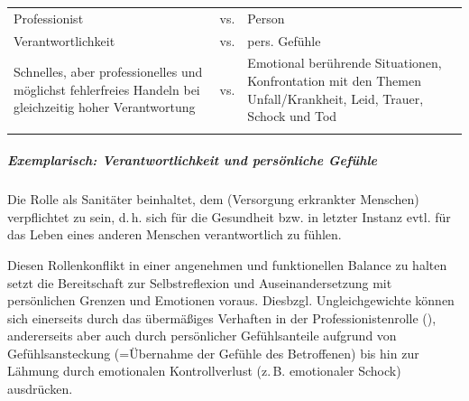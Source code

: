 {\begin{center}
  \FormatTable
\begin{tabularx}{\linewidth}{XcX}
\toprule\addlinespace
Professionist 
&
vs.
& 
Person 
\\\addlinespace
Verantwortlichkeit 
& 
vs.
& 
pers. Gefühle
\\\addlinespace
Schnelles, aber professionelles und möglichst fehlerfreies
Handeln bei gleichzeitig hoher Verantwortung
&
vs.
&
Emotional berührende Situationen, Konfrontation mit den
Themen Unfall/Krankheit, Leid, Trauer, Schock und Tod
\\\addlinespace\bottomrule
\end{tabularx}
\end{center}



\subparagraph{Exemplarisch: Verantwortlichkeit und
persönliche Gefühle}

Die Rolle als Sanitäter beinhaltet, dem
 (Versorgung erkrankter Menschen) 
verpflichtet zu sein, d.\,h. sich für die Gesundheit bzw. in letzter Instanz evtl. für
das Leben eines anderen Menschen verantwortlich zu fühlen.


Diesen Rollenkonflikt in einer angenehmen und funktionellen
Balance zu halten setzt die Bereitschaft zur Selbstreflexion
und Auseinandersetzung mit persönlichen Grenzen und
Emotionen voraus. Diesbzgl. Ungleichgewichte  können sich
einerseits durch das übermäßiges Verhaften in der
Professionistenrolle (),
andererseits aber auch durch 
persönlicher Gefühlsanteile aufgrund von Gefühlsansteckung (=Übernahme
der Gefühle des Betroffenen) bis hin zur Lähmung  durch
emotionalen Kontrollverlust (z.\,B. emotionaler Schock)
ausdrücken.

}
